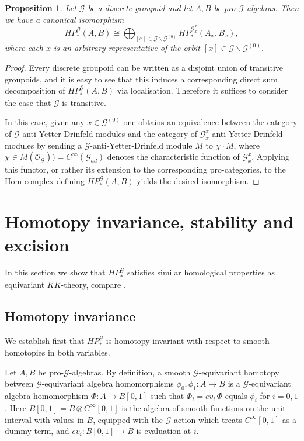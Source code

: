 \documentclass{amsart}
\newtheorem{prop}[thm]{Proposition}
\newcommand{\G}{\mathcal{G}}
\newcommand{\OG}{\mathcal{O}_{\mathcal{G}}}
\newcommand{\cinfty}{C^\infty}
\begin{document}
\begin{prop}
Let $ \G $ be a discrete groupoid and let $ A, B $ be pro-$ \G $-algebras. Then we have a canonical isomorphism 
$$
HP^\G_*(A,B) \cong \bigoplus_{[x] \in \G \backslash \G^{(0)}} HP^{\G^x_x}_*(A_x, B_x),
$$
where each $ x $ is an arbitrary representative of the orbit $ [x] \in \G \backslash \G^{(0)} $. 
\end{prop}

\begin{proof}
Every discrete groupoid can be written as a disjoint union of transitive groupoids, and it is easy to see that this induces a corresponding direct sum decomposition of $ HP^\G_*(A,B) $ via localisation. Therefore it suffices to consider the case that $ \G $ is transitive. 

In this case, given any $ x \in \G^{(0)} $ one obtains an equivalence between the category of $ \G $-anti-Yetter-Drinfeld modules and the category of $ \G^x_x$-anti-Yetter-Drinfeld modules by sending a $ \G $-anti-Yetter-Drinfeld module $ M $ to $ \chi \cdot M $, where $ \chi \in M(\OG)) = \cinfty(\G_{ad}) $ denotes the characteristic function of $ \G_x^x $. 
Applying this functor, or rather its extension to the corresponding pro-categories, to the Hom-complex defining $ HP^\G_*(A,B) $
yields the desired isomorphism. 
\end{proof}


\section{Homotopy invariance, stability and excision} \label{section:properties}

In this section we show that $ HP^\G_* $ satisfies similar homological properties as equivariant $ KK $-theory, compare \cite{BOENICKE_PROIETTI_categoricalbc}.  

\subsection{Homotopy invariance} \label{section:homotopy}

We establish first that $ HP^\G_* $ is homotopy invariant with respect to smooth homotopies in both variables. 

Let $ A, B $ be pro-$ \G $-algebras. By definition, a smooth $ \G $-equivariant homotopy between $ \G $-equivariant algebra homomorphisms $ \phi_0, \phi_1: A \rightarrow B $ is a $ \G $-equivariant algebra homomorphism $ \Phi: A \rightarrow B[0,1] $ such that $ \Phi_i = ev_i \,\Phi $ equals $ \phi_i $ for $ i = 0,1 $. Here $ B[0,1] = B \otimes C^\infty[0,1] $ is the algebra of smooth functions on the unit interval with values in $ B $, equipped with the $ \G $-action which treats $ C^\infty[0,1] $ as a dummy term, and $ ev_i: B[0,1] \rightarrow B $ is evaluation at $ i $. 
\end{document}
